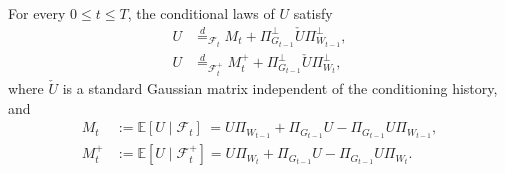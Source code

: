         \begin{proposition}
        \label{proposition:mf-proof-conditional-matrix}
        For every $0\leq t\leq T$, the conditional laws of $U$ satisfy
        \begin{align}
            U&\stackrel d=_{\mathcal F_t}
            M_t+\Pi_{G_{t-1}}^\perp\check U\Pi_{W_{t-1}}^\perp,
            \label{eq:mf-proof-matrix-forward}\\
            U&\stackrel d=_{\mathcal F_t^+}
            M_t^++\Pi_{G_{t-1}}^\perp\check U\Pi_{W_t}^\perp,
            \label{eq:mf-proof-matrix-backward}
        \end{align}
        where $\check U$ is a standard Gaussian matrix independent of the
        conditioning history, and
        \begin{align}
            M_t&:= \mathbb{E}[U \mid \mathcal{F}_t] \hspace{3pt} = U\Pi_{W_{t-1}}+\Pi_{G_{t-1}}U
                -\Pi_{G_{t-1}}U\Pi_{W_{t-1}} ,
            \label{eq:mf-proof-mean-forward}\\
            M_t^+&:= \mathbb{E}[U \mid \mathcal{F}_t^+] =U\Pi_{W_t}+\Pi_{G_{t-1}}U
                -\Pi_{G_{t-1}}U\Pi_{W_t}  .
            \label{eq:mf-proof-mean-backward}
        \end{align}
        \end{proposition}

